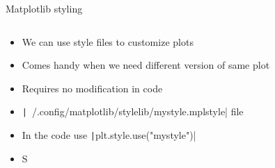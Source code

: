 \documentclass[aspectratio=169]{beamer}
\newcommand{\code}[2][python]{\texttt|#2|}
\begin{document}
\begin{frame}{Matplotlib styling}
    \begin{columns}
        \begin{column}{0.58\textwidth}
            \begin{itemize}
                \item We can use style files to customize plots
                \item Comes handy when we need different version of same plot
                \item Requires no modification in code
                \item \code{~/.config/matplotlib/stylelib/mystyle.mplstyle} file
                \item In the code use \code{plt.style.use("mystyle")}
            \end{itemize}
            \begin{itemize}
                \item S
            \end{itemize}
        \end{column}
        \begin{column}{0.40\textwidth}

\end{column}
\end{columns}
\end{frame}
\end{document}
